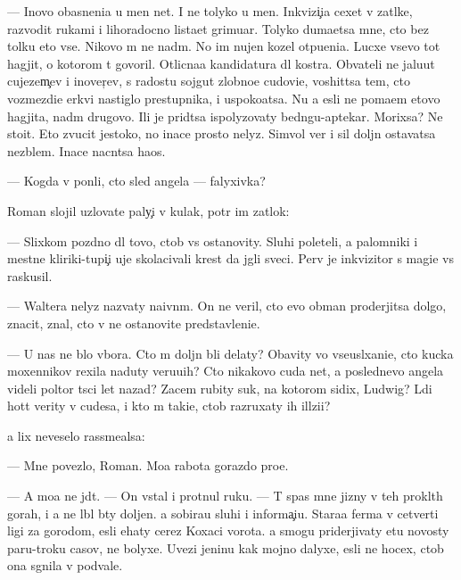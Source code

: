 \documentclass[10pt]{book}
\begin{document}
— Inovo ob{\y}asneni{\y}a u men{\ia} net. I ne tolyko u men{\ia}. Inkvizi{\c}i{\y}a cexet v zat{\yi}lke, razvodit rukami i lihoradocno lista{\y}et grimuar{\yi}. Tolyko duma{\y}etsa mne, cto bez tolku eto vse. Nikovo m{\yi} ne na{\y}d{\e}m. No im nujen kozel otpu{\x}eni{\y}a. Lucxe vsevo tot hagjit, o kotorom t{\yi} govoril. Otlicna{\y}a kandidatura dl{\ia} kostra. Ob{\yi}vateli ne jalu{\y}ut cujezem{\c}ev i inover{\c}ev, s radost{\y}u sojgut zlobno{\y}e cudovi{\x}e, voshit{\ia}tsa tem, cto vozmezdi{\y}e {\C}erkvi nastiglo prestupnika, i uspoko{\y}atsa. Nu a {\y}esli ne po{\y}ma{\y}em etovo hagjita, na{\y}d{\e}m drugovo. Ili je prid{\e}tsa ispolyzovaty bedn{\ia}gu-aptekar{\ia}. Mor{\x}ixsa? Ne sto{\y}it. Eto zvucit jestoko, no inace prosto nelyz{\ia}. Simvol{\yi} ver{\yi} i sil{\yi} doljn{\yi} ostavatsa nez{\yi}blem{\yi}. Inace nacn{\e}tsa haos.

— Kogda v{\yi} pon{\ia}li, cto sled angela — falyxivka?

Roman slojil uzlovat{\yi}{\y}e paly{\c}i v kulak, pot{\e}r im zat{\yi}lok:

— Slixkom pozdno dl{\ia} tovo, ctob{\yi} vs{\e} ostanovity. Sluhi poleteli, a palomniki i mestn{\yi}{\y}e kliriki-tupi{\c}i uje skolacivali krest da jgli sveci. Perv{\yi}{\y} je inkvizitor s magi{\y}e{\y} vs{\e} raskusil.

— Waltera nelyz{\ia} nazvaty naivn{\yi}m. On ne veril, cto {\y}evo obman proderjitsa dolgo, znacit, znal, cto v{\yi} ne ostanovite predstavleni{\y}e.

— U nas ne b{\yi}lo v{\yi}bora. Cto m{\yi} doljn{\yi} b{\yi}li delaty? Ob{\y}avity vo vseusl{\yi}xani{\y}e, cto kucka moxennikov rexila naduty veru{\y}u{\x}ih? Cto nikakovo cuda net, a poslednevo angela videli poltor{\yi} t{\yi}s{\ia}ci let nazad? Zacem rubity suk, na kotorom sidix, Ludwig? L{\iu}di hot{\ia}t verity v cudesa, i kto m{\yi} taki{\y}e, ctob{\yi} razruxaty ih ill{\iu}zi{\y}i?

{\Y}a lix neveselo rassme{\y}alsa:

— Mne povezlo, Roman. Mo{\y}a rabota gorazdo pro{\x}e.

— A mo{\y}a ne jd{\e}t. — On vstal i prot{\ia}nul ruku. — T{\yi} spas mne jizny v teh prokl{\ia}t{\yi}h gorah, i {\y}a ne l{\iu}bl{\iu} b{\yi}ty doljen. {\Y}a sobira{\y}u sluhi i informa{\c}i{\y}u. Stara{\y}a ferma v cetverti ligi za gorodom, {\y}esli {\y}ehaty cerez Koxac{\yf}i vorota. {\Y}a smogu priderjivaty etu novosty paru-tro{\y}ku casov, ne bolyxe. Uvezi jen{\x}inu kak mojno dalyxe, {\y}esli ne hocex, ctob{\yi} ona sgnila v podvale.
\end{document}
